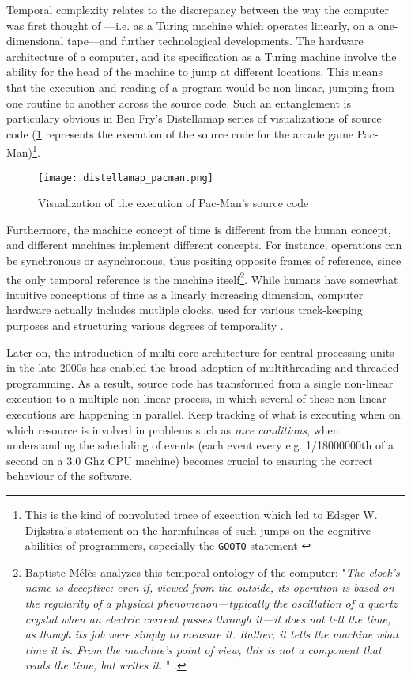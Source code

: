 Temporal complexity relates to the discrepancy between the way the computer was first thought of —i.e. as a Turing machine which operates linearly, on a one-dimensional tape—and further technological developments. The hardware architecture of a computer, and its specification as a Turing machine involve the ability for the head of the machine to jump at different locations. This means that the execution and reading of a program would be non-linear, jumping from one routine to another across the source code. Such an entanglement is particulary obvious in Ben Fry's Distellamap series of visualizations of source code (\ref{graphic:pacman-visualization} represents the execution of the source code for the arcade game Pac-Man)\footnote{This is the kind of convoluted trace of execution which led to Edsger W. Dijkstra's statement on the harmfulness of such jumps on the cognitive abilities of programmers, especially the \lstinline{GOOTO} statement \cite{dijkstra_letters_1968}}.

\begin{figure}
    \texttt{[image: distellamap\_pacman.png]}
    \caption{Visualization of the execution of Pac-Man's source code}
    \label{graphic:pacman-visualization}
\end{figure}

Furthermore, the machine concept of time is different from the human concept, and different machines implement different concepts. For instance, operations can be synchronous or asynchronous, thus positing opposite frames of reference, since the only temporal reference is the machine itself\footnote{Baptiste Mélès analyzes this temporal ontology of the computer: "\emph{The clock's name is deceptive: even if, viewed from the outside, its operation is based on the regularity of a physical phenomenon—typically the oscillation of a quartz crystal when an electric current passes through it—it does not tell the time, as though its job were simply to measure it. Rather, it tells the machine what time it is. From the machine's point of view, this is not a component that \emph{reads} the time, but \emph{writes} it. }" \citep{meles_time_2017}.}. While humans have somewhat intuitive conceptions of time as a linearly increasing dimension, computer hardware actually includes mutliple clocks, used for various track-keeping purposes and structuring various degrees of temporality \citep{meles_time_2017}.

Later on, the introduction of multi-core architecture for central processing units in the late 2000s has enabled the broad adoption of multithreading and threaded programming. As a result, source code has transformed from a single non-linear execution to a multiple non-linear process, in which several of these non-linear executions are happening in parallel. Keep tracking of what is executing when on which resource is involved in problems such as \emph{race conditions}, when understanding the scheduling of events (each event every e.g. 1/18000000th of a second on a 3.0 Ghz CPU machine) becomes crucial to ensuring the correct behaviour of the software.


